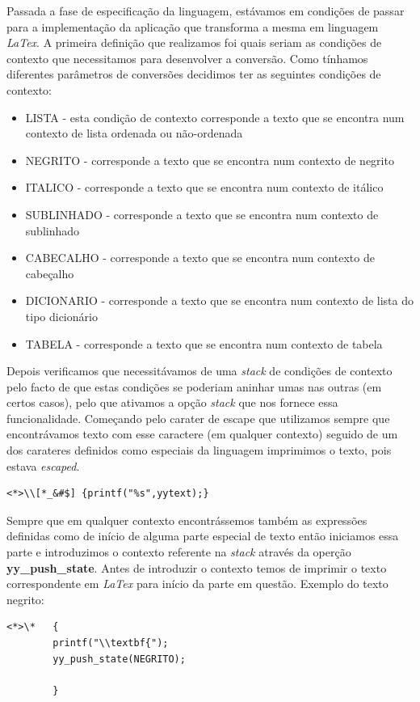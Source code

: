 \documentclass{article}
\begin{document}
Passada a fase de especificação da linguagem, estávamos em condições de passar para a implementação da aplicação que transforma a mesma em linguagem \textit{LaTex}. 
A primeira definição que realizamos foi quais seriam as condições de contexto que necessitamos para desenvolver a conversão. Como tínhamos diferentes parâmetros de conversões decidimos ter as seguintes condições de contexto:
\begin{itemize}
      \item LISTA - esta condição de contexto corresponde a texto que se encontra num contexto de lista ordenada ou não-ordenada
      \item NEGRITO - corresponde a texto que se encontra num contexto de negrito
      \item ITALICO - corresponde a texto que se encontra num contexto de itálico
      \item SUBLINHADO - corresponde a texto que se encontra num contexto de sublinhado
      \item CABECALHO - corresponde a texto que se encontra num contexto de cabeçalho
      \item DICIONARIO - corresponde a texto que se encontra num contexto de lista do tipo dicionário
      \item TABELA - corresponde a texto que se encontra num contexto de tabela
\end{itemize}
Depois verificamos que necessitávamos de uma \textit{stack} de condições de contexto pelo facto de que estas condições se poderiam aninhar umas nas outras (em certos casos), pelo que ativamos a opção \textit{stack} que nos fornece essa funcionalidade.
Começando pelo carater de escape que utilizamos sempre que encontrávamos texto com esse caractere (em qualquer contexto) seguido de um dos carateres definidos como especiais da linguagem imprimimos o texto, pois estava \textit{escaped}.
\begin{verbatim}
<*>\\[*_&#$] {printf("%s",yytext);}
\end{verbatim}
Sempre que em qualquer contexto encontrássemos também as expressões definidas como de início de alguma parte especial de texto então iniciamos essa parte e introduzimos o contexto referente na \textit{stack} através da operção \textbf{yy\_push\_state}. Antes de introduzir o contexto temos de imprimir o texto correspondente em \textit{LaTex} para início da parte em questão.
Exemplo do texto negrito:
\begin{verbatim}
<*>\*   { 
        printf("\\textbf{");
        yy_push_state(NEGRITO);
 
        }
\end{verbatim}
\end{document}
